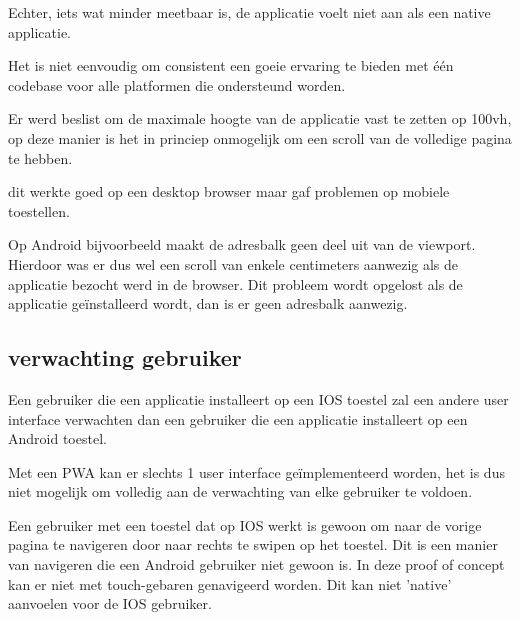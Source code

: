 	Echter, iets wat minder meetbaar is, de applicatie voelt niet aan als een native applicatie.
	
	Het is niet eenvoudig om consistent een goeie ervaring te bieden met één codebase voor alle platformen die ondersteund worden. 
	
	Er werd beslist om de maximale hoogte van de applicatie vast te zetten op 100vh,  op deze manier is het in princiep onmogelijk om een scroll van de volledige pagina te hebben. 
	
	dit werkte goed op een desktop browser maar gaf problemen op mobiele toestellen.
	
	Op Android bijvoorbeeld maakt de adresbalk geen deel uit van de viewport. Hierdoor was er dus wel een scroll van enkele centimeters aanwezig als de applicatie bezocht werd in de browser. Dit probleem wordt opgelost als de applicatie geïnstalleerd wordt, dan is er geen adresbalk aanwezig.
	
	\subsection{verwachting gebruiker}
		Een gebruiker die een applicatie installeert op een IOS toestel zal een andere user interface verwachten dan een gebruiker die een applicatie installeert op een Android toestel.
		
		Met een PWA kan er slechts 1 user interface geïmplementeerd worden, het is dus niet mogelijk om volledig aan de verwachting van elke gebruiker te voldoen.
		
		Een gebruiker met een toestel dat op IOS werkt is gewoon om naar de vorige pagina te navigeren door naar rechts te swipen op het toestel. Dit is een manier van navigeren die een Android gebruiker niet gewoon is. In deze proof of concept kan er niet met touch-gebaren genavigeerd worden. Dit kan niet 'native' aanvoelen voor de IOS gebruiker. 
	
	
	
	
			
		